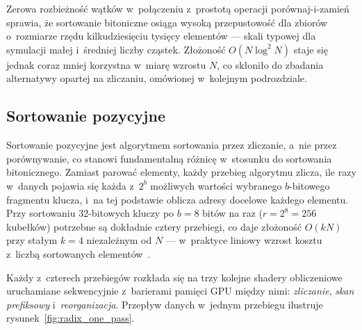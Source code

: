 Zerowa rozbieżność wątków w~połączeniu z~prostotą operacji porównaj-i-zamień sprawia,
że sortowanie bitoniczne osiąga wysoką przepustowość dla zbiorów o~rozmiarze rzędu
kilkudziesięciu tysięcy elementów --- skali typowej dla symulacji małej i~średniej liczby
cząstek. Złożoność $O(N \log^2 N)$ staje się jednak coraz mniej korzystna w~miarę wzrostu
$N$, co skłoniło do zbadania alternatywy opartej na zliczaniu, omówionej w~kolejnym
podrozdziale.

\subsection{Sortowanie pozycyjne}
\label{subsec:radix}

Sortowanie pozycyjne jest algorytmem sortowania przez zliczanie, a~nie przez porównywanie, co stanowi
fundamentalną różnicę w~stosunku do sortowania bitonicznego. Zamiast parować elementy,
każdy przebieg algorytmu zlicza, ile razy w~danych pojawia się każda z~$2^b$ możliwych
wartości wybranego $b$-bitowego fragmentu klucza, i~na tej podstawie oblicza adresy docelowe
każdego elementu. Przy sortowaniu 32-bitowych kluczy po $b=8$ bitów na raz
($r = 2^8 = 256$ kubełków) potrzebne są dokładnie cztery przebiegi, co daje złożoność
$O(kN)$ przy stałym $k=4$ niezależnym od $N$ --- w~praktyce liniowy wzrost kosztu z~liczbą
sortowanych elementów~\cite{harada2011introduction}.

Każdy z~czterech przebiegów rozkłada się na trzy kolejne shadery obliczeniowe
uruchamiane sekwencyjnie z~barierami pamięci GPU między nimi: \textit{zliczanie},
\textit{skan prefiksowy} i~\textit{reorganizacja}. Przepływ danych w~jednym przebiegu
ilustruje rysunek~\ref{fig:radix_one_pass}.

